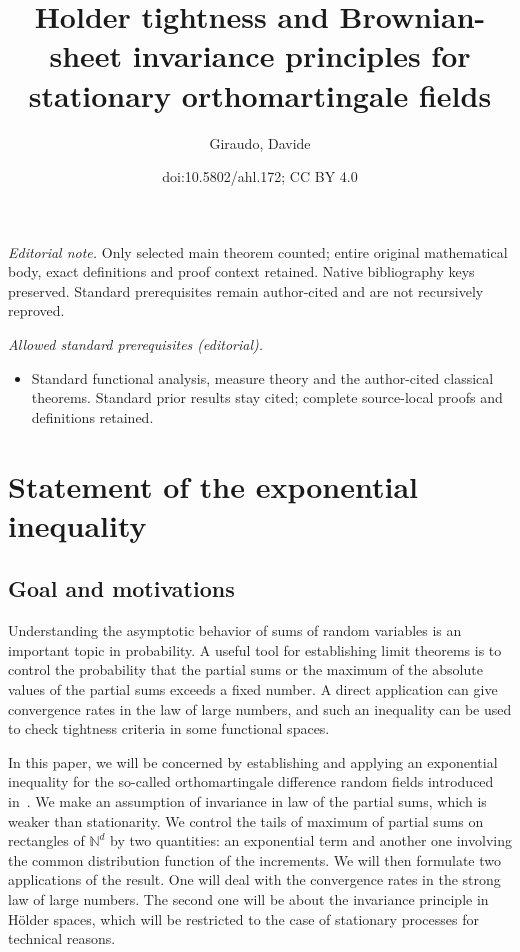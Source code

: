 \documentclass[10pt]{amsart}
\title{Holder tightness and Brownian-sheet invariance principles for stationary orthomartingale fields}
\author{Giraudo, Davide}
\date{doi:10.5802/ahl.172; CC BY 4.0}
\theoremstyle{definition}\newtheorem{defi}[theo]{Definition}\newtheorem{rema}[theo]{Remark}\newtheorem{exam}[theo]{Example}\newtheorem{exem}[theo]{Example}\newtheorem{nota}[theo]{Notation}
\newcommand\N{\mathbb{N}}
\begin{document}
\maketitle
\noindent\textit{Editorial note.} Only selected main theorem counted; entire original mathematical body, exact definitions and proof context retained. Native bibliography keys preserved. Standard prerequisites remain author-cited and are not recursively reproved.\par\medskip
\noindent\textit{Allowed standard prerequisites (editorial).}\begin{itemize}
\item Standard functional analysis, measure theory and the author-cited classical theorems. Standard prior results stay cited; complete source-local proofs and definitions retained.
\end{itemize}\medskip

\section{Statement of the exponential inequality}

\subsection{Goal and motivations} Understanding the asymptotic behavior of sums of random variables is an important topic in probability. A useful tool for establishing limit theorems is to control the probability that the partial sums or the maximum of the absolute values of the partial sums exceeds a fixed number. A direct application can give convergence rates in the law of large numbers, and such an inequality can be used to check tightness criteria in some functional spaces.

In this paper, we will be concerned by establishing and applying an exponential inequality for the so-called orthomartingale difference random fields introduced in~\cite{MR0254912}. We make an assumption of invariance in law of the partial sums, which is weaker than stationarity. We control the tails of maximum of partial sums on rectangles of $\N^d$ by two quantities: an exponential term and another one involving the common distribution function of the increments. We will then formulate two applications of the result. One will deal with the convergence rates in the strong law of large numbers. The second one will be about the invariance principle in H\"older spaces, which will be restricted to the case of stationary processes for technical reasons.
\end{document}
